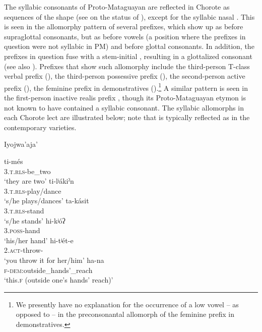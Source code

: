 The syllabic consonants of Proto-Mataguayan are reflected in Chorote as sequences of the shape  (see  on the status of ), except for the syllabic nasal . This is seen in the allomorphy pattern of several prefixes, which show up as  before supraglottal consonants, but as  before vowels (a position where the prefixes in question were not syllabic in PM) and before glottal consonants. In addition, the prefixes in question fuse with a stem-initial , resulting in a glottalized consonant (see also ). Prefixes that show such allomorphy include the third-person T-class verbal prefix (), the third-person possessive prefix (), the second-person active prefix (), the feminine prefix in demonstratives ().\footnote{We presently have no explanation for the occurrence of a low vowel -- as opposed to  -- in the preconsonantal allomorph of the feminine prefix in demonstratives.} A similar pattern is seen in the first-person inactive realis prefix , though its Proto-Mataguayan etymon is not known to have contained a syllabic consonant. The syllabic allomorphs in each Chorote lect are illustrated below; note that  is typically reflected as  in the contemporary varieties.

\ea\label{ex:syllc:ijw}
Iyojwa'aja' \citep{JC14a}
    \begin{xlist}
        \ex \gll ti-més\\
            3.\textsc{t.rls}-be\_two\\
            \glt `they are two'
        \ex \gll ti-lʲákiˀn\\
            3.\textsc{t.rls}-play/dance\\
            \glt `s/he plays/dances'
        \ex \gll ta-kásit\\
            3.\textsc{t.rls}-stand\\
            \glt `s/he stands'
        \ex\gll hi-kʲóʔ \\
            3.{\textsc{poss}}-hand\\
            \glt `his/her hand'
        \ex\gll hi-tʲét-e \\
            2.{\textsc{act}}-throw-\APPL\\
            \glt `you throw it for her/him'
        \ex\gll ha-na\\
            {\textsc{f}}-{\textsc{dem}}:outside\_hands'\_reach\\
            \glt `this.\textsc{f} (outside one’s hands’ reach)'
    \end{xlist}
\z

